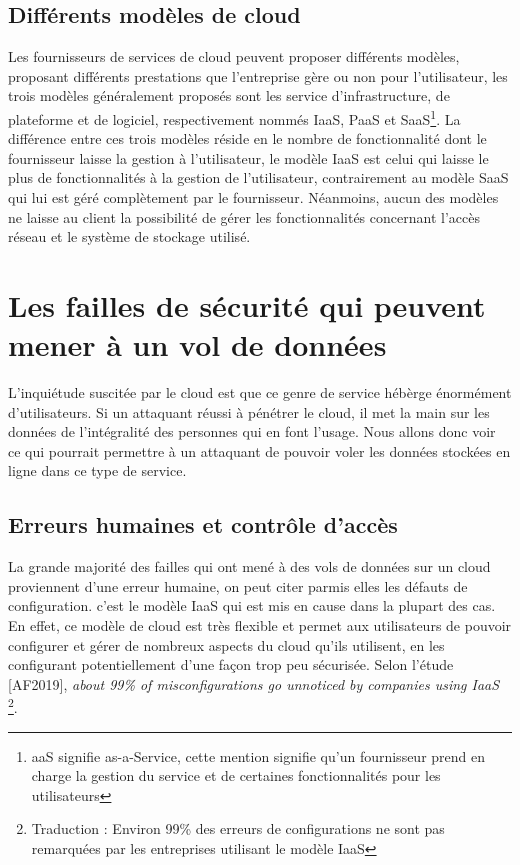 \documentclass[a4paper, 12pt]{article}
\begin{document}
    \subsection{Différents modèles de cloud}
      Les fournisseurs de services de cloud peuvent proposer différents modèles,
      proposant différents prestations que l'entreprise gère ou non pour
      l'utilisateur, les trois modèles généralement proposés sont les service
      d'infrastructure, de plateforme et de logiciel, respectivement nommés
      IaaS, PaaS et SaaS\footnote{aaS signifie as-a-Service, cette mention
      signifie qu'un fournisseur prend en charge la gestion du service et de
      certaines fonctionnalités pour les utilisateurs}. La différence entre ces
      trois modèles réside en le nombre de fonctionnalité dont le fournisseur
      laisse la gestion à l'utilisateur, le modèle IaaS est celui qui laisse le
      plus de fonctionnalités à la gestion de l'utilisateur, contrairement au
      modèle SaaS qui lui est géré complètement par le fournisseur. Néanmoins,
      aucun des modèles ne laisse au client la possibilité de gérer les
      fonctionnalités concernant l'accès réseau et le système de stockage
      utilisé.

  \section{Les failles de sécurité qui peuvent mener à un vol de données}
    L'inquiétude suscitée par le cloud est que ce genre de service hébèrge
    énormément d'utilisateurs. Si un attaquant réussi à pénétrer le cloud, il
    met la main sur les données de l'intégralité des personnes qui en font
    l'usage. Nous allons donc voir ce qui pourrait permettre à un attaquant de
    pouvoir voler les données stockées en ligne dans ce type de service.

    \subsection{Erreurs humaines et contrôle d'accès}
      La grande majorité des failles qui ont mené à des vols de données sur 
      un cloud proviennent d'une erreur humaine, on peut citer parmis elles les
      défauts de configuration. c'est le modèle IaaS qui est mis en cause dans
      la plupart des cas. En effet, ce modèle de cloud est très flexible et
      permet aux utilisateurs de pouvoir configurer et gérer de nombreux aspects
      du cloud qu'ils utilisent, en les configurant potentiellement d'une façon
      trop peu sécurisée. Selon l'étude [AF2019], \textit{about 99\% of
      misconfigurations go unnoticed by companies using IaaS}
      \footnote{Traduction : Environ 99\% des erreurs de configurations ne sont
      pas remarquées par les entreprises utilisant le modèle IaaS}. \\
\end{document}
